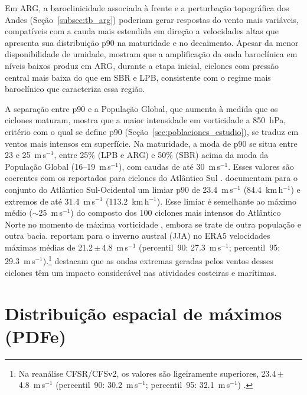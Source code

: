 Em ARG, a baroclinicidade associada à frente e a perturbação topográfica dos Andes (Seção~\ref{subsec:tb_arg}) poderiam gerar respostas do vento mais variáveis, compatíveis com a cauda mais estendida em direção a velocidades altas que apresenta sua distribuição p90 na maturidade e no decaimento.
Apesar da menor disponibilidade de umidade, \citet{gramcianinov2024early} mostram que a amplificação da onda baroclínica em níveis baixos produz em ARG, durante a etapa inicial, ciclones com pressão central mais baixa do que em SBR e LPB, consistente com o regime mais baroclínico que caracteriza essa região.

A separação entre p90 e a População Global, que aumenta à medida que os ciclones maturam, mostra que a maior intensidade em vorticidade a 850~hPa, critério com o qual se define p90 (Seção~\ref{sec:poblaciones_estudio}), se traduz em ventos mais intensos em superfície.
Na maturidade, a moda de p90 se situa entre 23 e 25~m\,s$^{-1}$, entre 25\% (LPB e ARG) e 50\% (SBR) acima da moda da População Global (16--19~m\,s$^{-1}$), com caudas de até 30~m\,s$^{-1}$.
Esses valores são coerentes com os reportados para ciclones do Atlântico Sul \citep{padilhareinke2026characterization, gramcianinov2020analysis}.
\citet{padilhareinke2026characterization} documentam para o conjunto do Atlântico Sul-Ocidental um limiar p90 de 23.4~m\,s$^{-1}$ (84.4~km\,h$^{-1}$) e extremos de até 31.4~m\,s$^{-1}$ (113.2~km\,h$^{-1}$).
Esse limiar é semelhante ao máximo médio (${\sim}$25~m\,s$^{-1}$) do composto dos 100 ciclones mais intensos do Atlântico Norte no momento de máxima vorticidade \citep{gentile2025response}, embora se trate de outra população e outra bacia.
\citet{gramcianinov2020analysis} reportam para o inverno austral (JJA) no ERA5 velocidades máximas médias de 21.2\,$\pm$\,4.8~m\,s$^{-1}$ (percentil~90: 27.3~m\,s$^{-1}$; percentil~95: 29.3~m\,s$^{-1}$).\footnote{Na reanálise CFSR/CFSv2, os valores são ligeiramente superiores, 23.4\,$\pm$\,4.8~m\,s$^{-1}$ (percentil~90: 30.2~m\,s$^{-1}$; percentil~95: 32.1~m\,s$^{-1}$) \citep{gramcianinov2020analysis}.}
\citet{gramcianinov2023impact} destacam que as ondas extremas geradas pelos ventos desses ciclones têm um impacto considerável nas atividades costeiras e marítimas.


\section{Distribuição espacial de máximos (PDFe)}\label{sec:pdfe_wind10}
